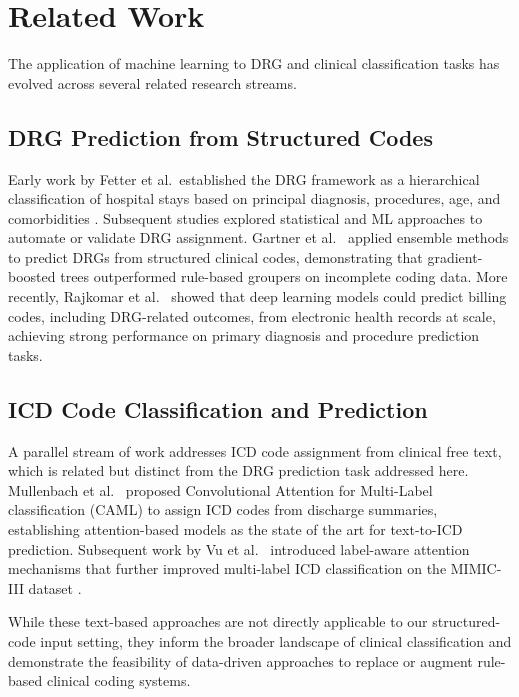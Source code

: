 \section{Related Work}

The application of machine learning to DRG and clinical classification tasks has evolved across several related research streams.

\subsection{DRG Prediction from Structured Codes}

Early work by Fetter et al.\ established the DRG framework as a hierarchical classification of hospital stays based on principal diagnosis, procedures, age, and comorbidities \cite{fetter1980drg}. Subsequent studies explored statistical and ML approaches to automate or validate DRG assignment. Gartner et al.\ \cite{gartner2015ml} applied ensemble methods to predict DRGs from structured clinical codes, demonstrating that gradient-boosted trees outperformed rule-based groupers on incomplete coding data. More recently, Rajkomar et al.\ \cite{rajkomar2018scalable} showed that deep learning models could predict billing codes, including DRG-related outcomes, from electronic health records at scale, achieving strong performance on primary diagnosis and procedure prediction tasks.

\subsection{ICD Code Classification and Prediction}

A parallel stream of work addresses ICD code assignment from clinical free text, which is related but distinct from the DRG prediction task addressed here. Mullenbach et al.\ \cite{mullenbach2018caml} proposed Convolutional Attention for Multi-Label classification (CAML) to assign ICD codes from discharge summaries, establishing attention-based models as the state of the art for text-to-ICD prediction. Subsequent work by Vu et al.\ \cite{vu2020label} introduced label-aware attention mechanisms that further improved multi-label ICD classification on the MIMIC-III dataset \cite{johnson2016mimic}.

While these text-based approaches are not directly applicable to our structured-code input setting, they inform the broader landscape of clinical classification and demonstrate the feasibility of data-driven approaches to replace or augment rule-based clinical coding systems.

